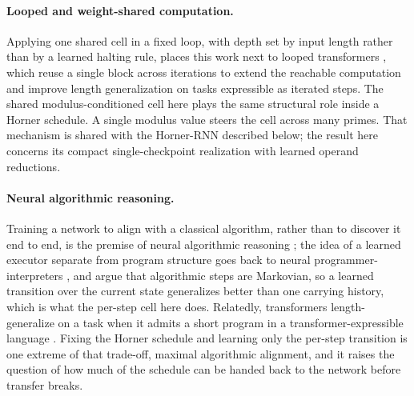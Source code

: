 \documentclass[11pt]{article}
\begin{document}
\paragraph{Looped and weight-shared computation.}
Applying one shared cell in a fixed loop, with depth set by input length rather
than by a learned halting rule, places this work next to looped transformers
\citep{fan2024looped}, which reuse a single block across iterations to extend the
reachable computation and improve length generalization on tasks expressible as
iterated steps. The shared modulus-conditioned cell here plays the same structural
role inside a Horner schedule. A single modulus value steers the cell across many
primes. That mechanism is shared with the Horner-RNN described below; the result
here concerns its compact single-checkpoint realization with learned operand
reductions.

\paragraph{Neural algorithmic reasoning.}
Training a network to align with a classical algorithm, rather than to discover it
end to end, is the premise of neural algorithmic reasoning \citep{velickovic2021nar}; the
idea of a learned executor separate from program structure goes back to neural
programmer-interpreters \citep{reed2016npi}, and \citet{bohde2024markov} argue that
algorithmic steps are Markovian, so a learned transition over the current state
generalizes better than one carrying history, which is what the per-step cell here
does. Relatedly, transformers length-generalize on a task when it admits a short
program in a transformer-expressible language \citep{zhou2023rasp}. Fixing the Horner schedule
and learning only the per-step transition is one extreme of that trade-off, maximal
algorithmic alignment, and it raises the question of how much of the schedule can be
handed back to the network before transfer breaks.
\end{document}
